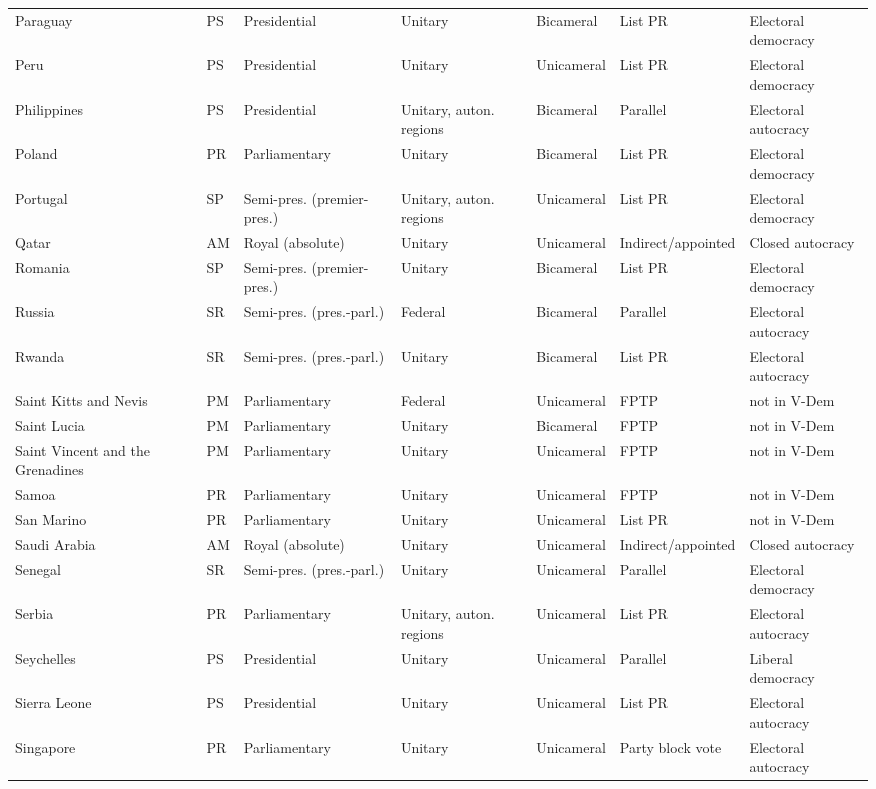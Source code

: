 \documentclass[11pt,a4paper]{article}
\begin{document}
{\begin{longtable}{p{2.9cm}lp{2.9cm}p{2.4cm}lp{1.9cm}p{2.0cm}}
Paraguay & PS & Presidential & Unitary & Bicameral & List PR & Electoral democracy\\
Peru & PS & Presidential & Unitary & Unicameral & List PR & Electoral democracy\\
Philippines & PS & Presidential & Unitary, auton. regions & Bicameral & Parallel & Electoral autocracy\\
Poland & PR & Parliamentary & Unitary & Bicameral & List PR & Electoral democracy\\
Portugal & SP & Semi-pres. (premier-pres.) & Unitary, auton. regions & Unicameral & List PR & Electoral democracy\\
Qatar & AM & Royal (absolute) & Unitary & Unicameral & Indirect/appointed & Closed autocracy\\
Romania & SP & Semi-pres. (premier-pres.) & Unitary & Bicameral & List PR & Electoral democracy\\
Russia & SR & Semi-pres. (pres.-parl.) & Federal & Bicameral & Parallel & Electoral autocracy\\
Rwanda & SR & Semi-pres. (pres.-parl.) & Unitary & Bicameral & List PR & Electoral autocracy\\
Saint Kitts and Nevis & PM & Parliamentary & Federal & Unicameral & FPTP & not in V-Dem\\
Saint Lucia & PM & Parliamentary & Unitary & Bicameral & FPTP & not in V-Dem\\
Saint Vincent and the Grenadines & PM & Parliamentary & Unitary & Unicameral & FPTP & not in V-Dem\\
Samoa & PR & Parliamentary & Unitary & Unicameral & FPTP & not in V-Dem\\
San Marino & PR & Parliamentary & Unitary & Unicameral & List PR & not in V-Dem\\
Saudi Arabia & AM & Royal (absolute) & Unitary & Unicameral & Indirect/appointed & Closed autocracy\\
Senegal & SR & Semi-pres. (pres.-parl.) & Unitary & Unicameral & Parallel & Electoral democracy\\
Serbia & PR & Parliamentary & Unitary, auton. regions & Unicameral & List PR & Electoral autocracy\\
Seychelles & PS & Presidential & Unitary & Unicameral & Parallel & Liberal democracy\\
Sierra Leone & PS & Presidential & Unitary & Unicameral & List PR & Electoral autocracy\\
Singapore & PR & Parliamentary & Unitary & Unicameral & Party block vote & Electoral autocracy\\

\end{longtable}}
\end{document}
